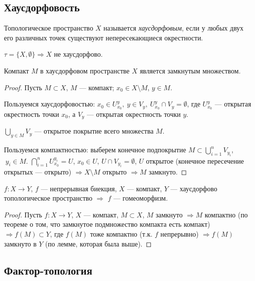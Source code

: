 \subsection{Хаусдорфовость}
\begin{definition}
    Топологическое пространство $X$ называется \textit{хаусдорфовым}, если у любых двух его различных точек существуют непересекающиеся окрестности.
\end{definition}

$\tau = \{X, \emptyset\} \Longrightarrow X$ не хаусдорфово.

\begin{lemma}
    Компакт $M$ в хаусдорфовом пространстве $X$ является замкнутым множеством.
\end{lemma}
\begin{proof}
    Пусть $M \subset X$, $M$ — компакт;
    $x_0 \in X \setminus M$, $y \in M$.

    Пользуемся хаусдорфовостью: $x_0 \in U_{x_0}^y, \ y \in V_y, \ U_{x_0}^y \cap V_y = \emptyset$, где $U_{x_0}^y$ — открытая окрестность точки $x_0$, а $V_y$ — открытая окрестность точки $y$.

    $\bigcup_{y \in M} V_y$ — открытое покрытие всего множества $M$.

    Пользуемся компактностью: выберем конечное подпокрытие $M \subset \bigcup_{i = 1}^n V_{y_i}$, $\ y_i \in M$.
    $\bigcap_{i = 1}^n U_{x_0}^{y_i} = U$, $x_0 \in U$, $U \cap V_{y_i} = \emptyset$, $U$ открытое (конечное пересечение открытых — открыто) $\Longrightarrow X \setminus M$ открыто $\Longrightarrow M$ замкнуто.
\end{proof}

\begin{statement}
    $f: X \to Y$, $f$ — непрерывная биекция, $X$ — компакт, $Y$ — хаусдорфово топологическое пространство $\Longrightarrow$ $f$ — гомеоморфизм.
\end{statement}
\begin{proof}
    Пусть $f: X \to Y$, $X$ — компакт, $M \subset X$, $M$ замкнуто $\Longrightarrow M$ компактно (по теореме о том, что замкнутое подмножество компакта есть компакт) $\Longrightarrow f(M) \subset Y$, где $f(M)$ тоже компактно (т.к. $f$ непрерывно) $\Longrightarrow f(M)$ замкнуто в $Y$ (по лемме, которая была выше). 
\end{proof}


\subsection{Фактор-топология}

